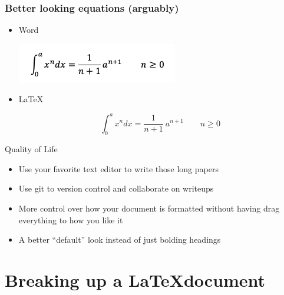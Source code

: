 \documentclass{beamer}
\begin{document}
\begin{frame}[fragile]
  \frametitle{Better looking equations (arguably)}

  \begin{itemize}

  \item{Word}

  \includegraphics[scale=.75]{word-equation.png}

  \item{\LaTeX}

  \begin{equation}
  \int_0^a x^n dx = \frac{1}{n+1}\
  a^{n+1} \qquad n \geq 0
  \end{equation}

  \end{itemize}

\end{frame}

\begin{frame}{Quality of Life}
  \begin{itemize}
    \item<1-> {Use your favorite text editor to write those long papers}
    \item<2-> {Use git to version control and collaborate on writeups}
    \item<3-> {More control over how your document is formatted without having drag everything to how you like it}
    \item<4-> {A better ``default'' look instead of just bolding headings}
  \end{itemize}
\end{frame}

\section{Breaking up a \LaTeX document}
\end{document}
